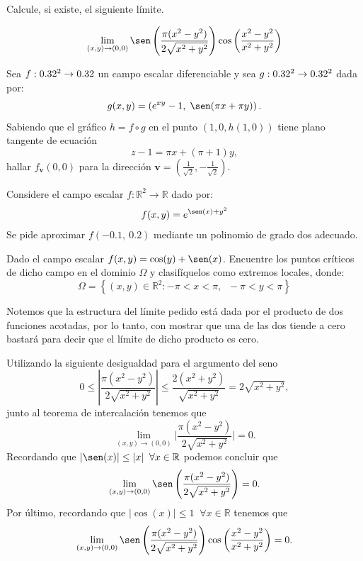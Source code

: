 \begin{question}
    Calcule, si existe, el siguiente l\'imite.

    \[
        \lim_{(x,y)\to(0,0)}\sen\left(\frac{\pi(x^{2}-y^{2})}{2\sqrt{x^{2}+y^{2}}}\right) \cos\left(\frac{x^{2}-y^{2}}{x^{2}+y^{2}}\right)
    \]
\end{question}

\begin{question}
    Sea $f:0.32^2\to0.32$ un campo escalar diferenciable y sea $g:0.32^2\to0.32^2$ dada por: $$g(x,y)=\left(e^{xy}-1,\;\sen(\pi x+\pi y)\right).$$   \noindent Sabiendo que el gr\'afico $h=f\circ g$ en el punto $(1,0,h(1,0))$ tiene plano tangente de ecuaci\'on $$z-1=\pi x+(\pi+1) y,$$  hallar $f_{\mathbf{v}}(0,0)$ para la direcci\'on ${\mathbf{v}}=\left(\frac{1}{\sqrt{2}},-\frac{1}{\sqrt{2}}\right)$.
\end{question}

\begin{question}
    Considere el campo escalar $f:\mathbb{R}^{2}\rightarrow\mathbb{R}$ dado por:  $$f(x,y)=e^{\sen(x)+y^{2}}$$
    \noindent Se pide aproximar $f(-0\text{.}1,\:0\text{.}2)$ mediante un polinomio de grado dos adecuado.
\end{question}

\begin{question}
    Dado el campo escalar $\displaystyle f(x,y)=\cos(y)+\sen(x)$. Encuentre los puntos cr\'iticos de dicho campo en el dominio $\Omega$ y clasif\'iquelos como extremos locales, donde:  \[\Omega=\left\{(x,y)\in\mathbb{R}^{2}: -\pi<x<\pi,\;\;-\pi<y<\pi \right\}\]
\end{question}

\newpage

\begin{solution}
    Notemos que la estructura del límite pedido está dada por el producto de dos funciones acotadas, por lo tanto, con mostrar que una de las dos tiende a cero bastar\'a para decir que el límite de dicho producto es cero.

    Utilizando la siguiente desigualdad para el argumento del seno
    \[ 
    0 \leq \left| \frac{\pi(x^{2}-y^{2})}{2\sqrt{x^{2}+y^{2}}} \right| \leq
    \frac{2(x^2+y^2)}{\sqrt{x^2+y^2}} = 2 \sqrt{x^2+y^2},
    \]
    junto al teorema de intercalaci\'on tenemos que
    \[
        \lim_{(x,y)\to(0,0)}\bigg| \frac{\pi(x^{2}-y^{2})}{2\sqrt{x^{2}+y^{2}}}\bigg|=0.
    \]
    Recordando que $|\sen(x)| \leq |x| \; \; \forall x \in \mathbb{R}$ podemos concluir que
    \[
        \lim_{(x,y)\to(0,0)}\sen\left(\frac{\pi(x^{2}-y^{2})}{2\sqrt{x^{2}+y^{2}}}\right)=0.
    \]
    Por \'ultimo, recordando que $|\cos(x)| \leq 1 \; \; \forall x \in \mathbb{R}$  tenemos que
    \[
        \lim_{(x,y)\to(0,0)}\sen\left(\frac{\pi(x^{2}-y^{2})}{2\sqrt{x^{2}+y^{2}}}\right) \cos\left(\frac{x^{2}-y^{2}}{x^{2}+y^{2}}    \right)=0.
    \]
\end{solution}


